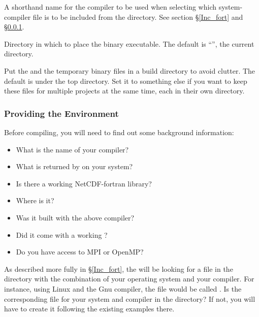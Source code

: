 \begin{klist}
 A shorthand name for the compiler to be used when
selecting which system-compiler file is to be included from the
 directory. See section \S\ref{Inc_fort} and
\S\ref{make_env}.


\begin{klist}
   Directory in which to place the binary executable.
The default is ``'', the current directory.

   Put the  and the temporary binary files
in a build directory to avoid clutter. The default is 
under the top directory. Set it to something else if you want
to keep these files for multiple projects at the same time, each in
their own directory.
\end{klist}
\end{klist}

\subsubsection{Providing the Environment}
\label{make_env}

Before compiling, you will need to find out some background information:
\begin{itemize}
 \item What is the name of your compiler?
 \item What is returned by  on your system?
 \item Is there a working NetCDF-fortran library?
 \item Where is it?
 \item Was it built with the above compiler?
 \item Did it come with a working ?
 \item Do you have access to MPI or OpenMP?
\end{itemize}
As described more fully in \S\ref{Inc_fort}, the  will be
looking for a file in the  directory with the
combination of your operating system and your compiler. For
instance, using Linux and the Gnu compiler, the file would be
called . Is the corresponding file for your
system and compiler in the  directory? If not, you
will have to create it following the existing examples there.

